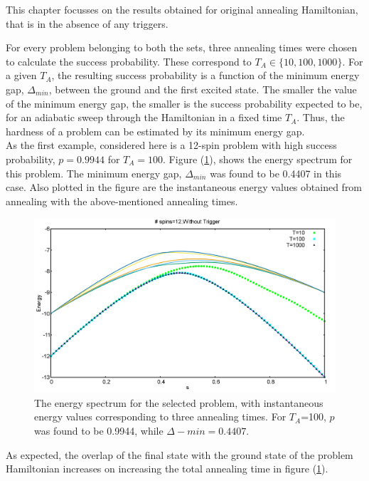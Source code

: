\documentclass[12]{article}
\begin{document}
This chapter focusses on the results obtained for original annealing Hamiltonian, that is in the absence of any triggers. 


For every problem belonging to both the sets, three annealing times were chosen to calculate the success probability. These correspond to $T_A \in \{ 10,100,1000 \}$. For a given $T_A$, the resulting success probability is a function of the minimum energy gap, $\Delta_{min}$, between the ground and the first excited state. The smaller the value of the minimum energy gap, the smaller is the success probability expected to be, for an adiabatic sweep through the Hamiltonian in a fixed time $T_A$. Thus, the hardness of a problem can be estimated by its minimum energy gap.\\


As the first example, considered here is a 12-spin problem with high success probability, $p=0.9944$ for $T_A=100$. Figure (\ref{fig:o2}), shows the energy spectrum for this problem. The minimum energy gap, $\Delta_{min}$ was found to be 0.4407 in this case.  Also plotted in the figure are the instantaneous energy values obtained from annealing with the above-mentioned annealing times.
\begin{figure}[H]
\centering 
\includegraphics[scale=0.3]{733_s12_O.png}
\caption{The energy spectrum for the selected problem, with instantaneous energy values corresponding to three annealing times. For $T_A$=100, $p$ was found to be 0.9944, while $\Delta-{min}=0.4407.$}
\label{fig:o2}
\end{figure}

As expected, the overlap of the final state with the ground state of the problem Hamiltonian increases on increasing the total annealing time in figure (\ref{fig:o2}).\\
\end{document}
